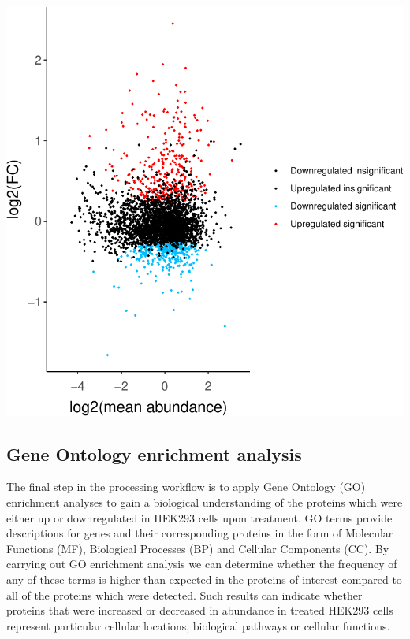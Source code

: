 \documentclass[9pt,a4paper,]{extarticle}
\begin{document}
\begin{center}\includegraphics[height=0.4\textheight]{workflow_expressions_files/figure-latex/MA_plot-1} \end{center}

\subsection{Gene Ontology enrichment analysis}\label{gene-ontology-enrichment-analysis}

The final step in the processing workflow is to apply Gene Ontology (GO) enrichment
analyses to gain a biological understanding of the proteins which were either up
or downregulated in HEK293 cells upon treatment. GO terms provide descriptions
for genes and their corresponding proteins in the form of Molecular Functions
(MF), Biological Processes (BP) and Cellular Components (CC). By carrying out GO
enrichment analysis we can determine whether the frequency of any of these terms
is higher than expected in the proteins of interest compared to all of the proteins
which were detected. Such results can indicate whether proteins that were
increased or decreased in abundance in treated HEK293 cells represent particular
cellular locations, biological pathways or cellular functions.
\end{document}
